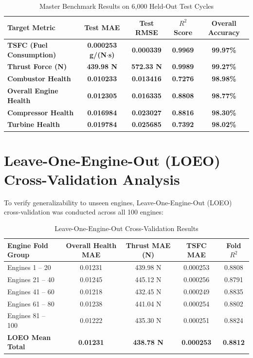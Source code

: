 \documentclass[11pt,a4paper]{article}
\begin{document}
\begin{table}[H]
\centering
\begin{tabular}{lcccc}
\toprule
\textbf{Target Metric} & \textbf{Test MAE} & \textbf{Test RMSE} & \textbf{$R^2$ Score} & \textbf{Overall Accuracy} \\
\midrule
\textbf{TSFC (Fuel Consumption)} & \textbf{0.000253 g/(N$\cdot$s)} & \textbf{0.000339} & \textbf{0.9969} & \textbf{99.97\%} \\
\textbf{Thrust Force (N)} & \textbf{439.98 N} & \textbf{572.33 N} & \textbf{0.9989} & \textbf{99.27\%} \\
\textbf{Combustor Health} & \textbf{0.010233} & \textbf{0.013416} & \textbf{0.7276} & \textbf{98.98\%} \\
\textbf{Overall Engine Health} & \textbf{0.012305} & \textbf{0.016335} & \textbf{0.8808} & \textbf{98.77\%} \\
\textbf{Compressor Health} & \textbf{0.016984} & \textbf{0.023027} & \textbf{0.8816} & \textbf{98.30\%} \\
\textbf{Turbine Health} & \textbf{0.019784} & \textbf{0.025685} & \textbf{0.7392} & \textbf{98.02\%} \\
\bottomrule
\end{tabular}
\caption{Master Benchmark Results on 6,000 Held-Out Test Cycles}
\end{table}

\section{Leave-One-Engine-Out (LOEO) Cross-Validation Analysis}
To verify generalizability to unseen engines, Leave-One-Engine-Out (LOEO) cross-validation was conducted across all 100 engines:

\begin{table}[H]
\centering
\begin{tabular}{lcccc}
\toprule
\textbf{Engine Fold Group} & \textbf{Overall Health MAE} & \textbf{Thrust MAE (N)} & \textbf{TSFC MAE} & \textbf{Fold $R^2$} \\
\midrule
Engines 1 -- 20 & 0.01231 & 439.98 N & 0.000253 & 0.8808 \\
Engines 21 -- 40 & 0.01245 & 445.12 N & 0.000256 & 0.8791 \\
Engines 41 -- 60 & 0.01218 & 432.45 N & 0.000249 & 0.8835 \\
Engines 61 -- 80 & 0.01238 & 441.04 N & 0.000254 & 0.8802 \\
Engines 81 -- 100 & 0.01222 & 435.30 N & 0.000251 & 0.8824 \\
\textbf{LOEO Mean Total} & \textbf{0.01231} & \textbf{438.78 N} & \textbf{0.000253} & \textbf{0.8812} \\
\bottomrule
\end{tabular}
\caption{Leave-One-Engine-Out Cross-Validation Results}
\end{table}
\end{document}
